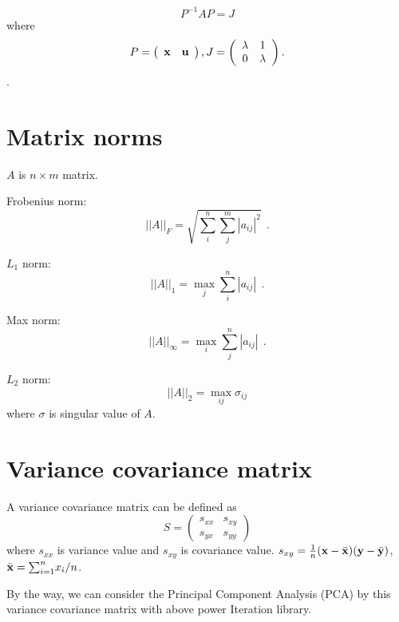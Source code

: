 \documentclass[dvipdfmx]{article}
\begin{document}
$$P^{-1}AP = J$$ where
\[
   P =
   \left(
   \begin{array}{cc}
   {\bf{x}} & {\bf{u}} 
   \end{array}
   \right) ,
   J =
   \left(
   \begin{array}{cc}
   {\lambda} & 1 \\
   0 & {\lambda}
   \end{array}
   \right).
  \] .


\section*{Matrix norms}
$A$ is $n{\times}m$ matrix.

Frobenius norm:
$$
||A||_F = \sqrt{{\sum_i^n}{\sum_j^m} |a_{ij}|^2} \ \ .
$$
 
$L_1$ norm:
$$
||A||_1 = \max_{j}  {\sum_i^n} |a_{ij}| \ \ .
$$

Max norm:
$$
||A||_{\infty} = \max_{i}  {\sum_j^n} |a_{ij}| \ \ .
$$

$L_2$ norm:
$$
||A||_2 = \max_{ij}  {\sigma}_{ij}
$$
where $\sigma$ is singular value of $A$.


\section*{Variance covariance matrix}
A variance covariance matrix can be defined as
 \[
   S =
   \left(
   \begin{array}{cc}
   s_{xx} & s_{xy} \\
   s_{yx} & s_{yy}  
   \end{array}
   \right) 
  \]
where $s_{xx}$ is variance value and $s_{xy}$ is covariance value.
$s_{xy} = \frac{1}{n}({\bf{x}} - \bar{\bf{x}})({\bf{y}} - \bar{\bf{y}})$, $\bar{\bf{x}} = {\sum_{i=1}^n} x_i /n$.

By the way, we can consider the Principal Component Analysis (PCA) by this variance covariance matrix with above power Iteration library.
\end{document}
